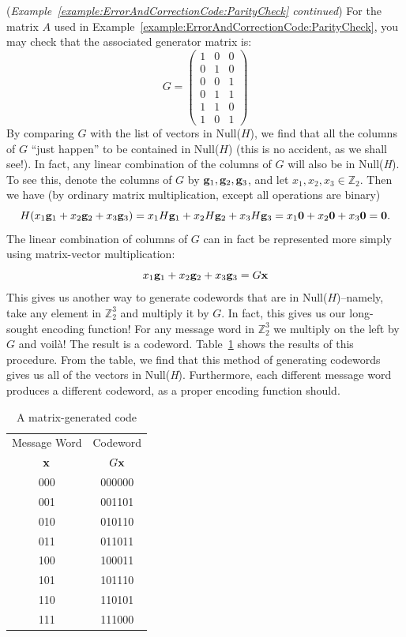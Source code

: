 \begin{example}{}
(\emph{Example~\ref{example:ErrorAndCorrectionCode:ParityCheck} continued})
For the matrix $A$ used in Example~\ref{example:ErrorAndCorrectionCode:ParityCheck}, you may check that the associated generator matrix is:
\[
G=
\left(
\begin{array}{ccc}
1 & 0 & 0 \\
0 & 1 & 0 \\
0 & 0 & 1 \\
0 & 1 & 1 \\
1 & 1 & 0 \\
1 & 0 & 1
\end{array}
\right)
\]
By comparing $G$ with the  list of vectors in Null($H$), we find that all the columns of $G$ ``just happen'' to be  contained in Null($H$) (this is no accident, as we shall see!). In fact, any linear combination of the columns of $G$ will also be in Null(\emph{H}). To see this, denote the columns of $G$ by ${\bold g}_1, {\bold g}_2, {\bold g}_3$, and let $x_1, x_2, x_3 \in \mathbb{Z}_2$. Then  we have (by ordinary matrix multiplication, except all operations are binary)
\[
H (x_1 {\bold g}_1 + x_2{\bold g}_2 + x_3{\bold g}_3) = 
x_1H {\bold g}_1 + x_2H{\bold g}_2 + x_3H{\bold g}_3
= x_1 {\bold 0} + x_2{\bold 0} + x_3{\bold 0} = {\bold 0}.
\]
 The linear combination of columns of $G$ can in fact be represented more simply using matrix-vector multiplication:
\[x_1 {\bold g}_1 + x_2{\bold g}_2 + x_3{\bold g}_3 = G{\bold x} 
\]
This gives us another way to generate codewords that are in Null($H$)--namely, take any element in $\mathbb{Z}_2^3$ and multiply it by $G$. In fact, this gives us our long-sought encoding function! For any message word in $\mathbb{Z}_2^3$ we multiply on the left by $G$ and voil\`{a}! The result is a codeword.
Table~\ref{table:ErrorAndCorrectionCode:generator} shows the results of this procedure. From the table, we find that this method of generating codewords gives us all of the vectors in Null(\emph{H}). Furthermore, each different message word produces a different codeword, as a proper encoding function should.
 
\begin{table}[htb]
\caption{A matrix-generated code}\label{table:ErrorAndCorrectionCode:generator}{\small
\begin{center}
\begin{tabular}{|c|c|}
\hline
Message Word  & Codeword \\
${\bold x}$ & $G {\bold x}$ \\ \hline
000 & 000000 \\
001 & 001101 \\
010 & 010110 \\
011 & 011011 \\
100 & 100011 \\
101 & 101110 \\
110 & 110101 \\
111 & 111000 \\
\hline
\end{tabular}
\end{center}
}
\end{table}
\end{example}

